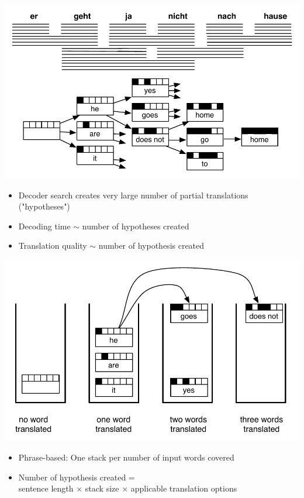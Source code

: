 \documentclass[landscape]{uedslides2C}
\begin{document}
\begin{center} 
\includegraphics[scale=0.95]{decoding-step5.pdf}
\end{center}
\begin{itemize} \itemsep -1mm
\item Decoder search creates very large number of partial translations ("hypotheses")
\item Decoding time $\sim$ number of hypotheses created
\item Translation quality $\sim$ number of hypothesis created
\end{itemize}


\begin{center} 
\includegraphics[scale=1]{hypothesis-stacks-fw.pdf}
\end{center}
\vspace{-2mm}
\begin{itemize} \itemsep -2mm
\item Phrase-based: One stack per number of input words covered
\item Number of hypothesis created = \\
sentence length $\times$ stack size $\times$ applicable translation options
\end{itemize}
\end{document}
